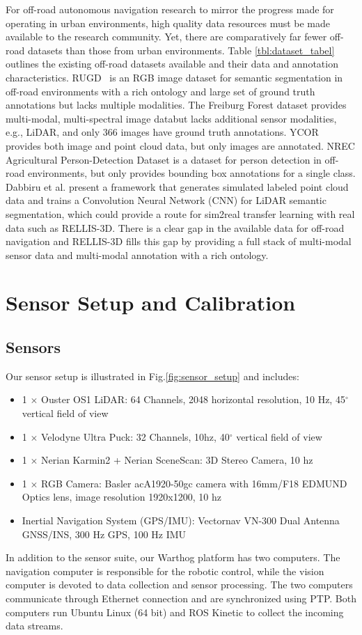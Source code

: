 \documentclass[letterpaper, 10 pt, conference]{ieeeconf}
\begin{document}
For off-road autonomous navigation research to mirror the progress made for operating in urban environments, high quality data resources must be made available to the research community. Yet, there are comparatively far fewer off-road datasets than those from urban environments. Table \ref{tbl:dataset_tabel} outlines the existing off-road datasets available and their data and annotation characteristics. RUGD~\cite{RUGD2019IROS} is an RGB image dataset for semantic segmentation in off-road environments with a rich ontology and large set of ground truth annotations but lacks multiple modalities. The Freiburg Forest dataset \cite{valada16iser} provides multi-modal, multi-spectral image databut lacks additional sensor modalities, e.g., LiDAR, and only 366 images have ground truth annotations. YCOR \cite{Maturana2018} provides both image and point cloud data, but only images are annotated. NREC Agricultural Person-Detection Dataset is a dataset for person detection in off-road environments, but only provides bounding box annotations for a single class. Dabbiru et al. \cite{Dabbiru2020,Goodin2018} present a framework that generates simulated labeled point cloud data and trains a Convolution Neural Network (CNN) for LiDAR semantic segmentation, which could provide a route for sim2real transfer learning with real data such as RELLIS-3D. There is a clear gap in the available data for off-road navigation and RELLIS-3D fills this gap by providing a full stack of multi-modal sensor data and multi-modal annotation with a rich ontology.  \section{Sensor Setup and Calibration}
\subsection{Sensors}
Our sensor setup is illustrated in Fig.\ref{fig:sensor_setup} and includes:


\begin{itemize}
  \item 1 \(\times\) Ouster OS1 LiDAR: 64 Channels, 2048 horizontal resolution, 10 Hz, 45$^{\circ}$ vertical field of view
  \item 1 \(\times\) Velodyne Ultra Puck: 32 Channels, 10hz, 40$^{\circ}$ vertical field of view
  \item 1 \(\times\) Nerian Karmin2 + Nerian  SceneScan: 3D Stereo Camera, 10 hz
  \item 1 \(\times\) RGB Camera: Basler acA1920-50gc camera with 16mm/F18 EDMUND Optics lens, image resolution 1920x1200, 10 hz
  \item Inertial Navigation System (GPS/IMU):  Vectornav VN-300 Dual Antenna GNSS/INS, 300 Hz GPS, 100 Hz IMU
\end{itemize}
In addition to the sensor suite, our Warthog platform has two computers. The navigation computer is responsible for the robotic control, while the vision computer is devoted to data collection and sensor processing. The two computers communicate through Ethernet connection and are synchronized using PTP. Both computers run Ubuntu Linux (64 bit) and ROS Kinetic to collect the incoming data streams. 
\end{document}

